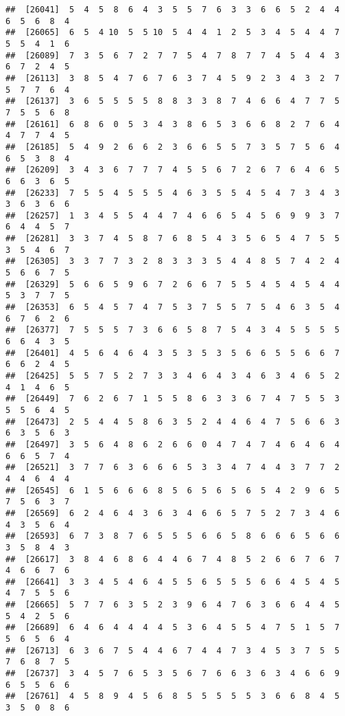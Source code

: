 \documentclass[
]{book}
\begin{document}
\begin{verbatim}
##  [26041]  5  4  5  8  6  4  3  5  5  7  6  3  3  6  6  5  2  4  4  6  5  6  8  4
##  [26065]  6  5  4 10  5  5 10  5  4  4  1  2  5  3  4  5  4  4  7  5  5  4  1  6
##  [26089]  7  3  5  6  7  2  7  7  5  4  7  8  7  7  4  5  4  4  3  6  7  2  4  5
##  [26113]  3  8  5  4  7  6  7  6  3  7  4  5  9  2  3  4  3  2  7  5  7  7  6  4
##  [26137]  3  6  5  5  5  5  8  8  3  3  8  7  4  6  6  4  7  7  5  7  5  5  6  8
##  [26161]  6  8  6  0  5  3  4  3  8  6  5  3  6  6  8  2  7  6  4  4  7  7  4  5
##  [26185]  5  4  9  2  6  6  2  3  6  6  5  5  7  3  5  7  5  6  4  6  5  3  8  4
##  [26209]  3  4  3  6  7  7  7  4  5  5  6  7  2  6  7  6  4  6  5  6  6  3  6  5
##  [26233]  7  5  5  4  5  5  5  4  6  3  5  5  4  5  4  7  3  4  3  3  6  3  6  6
##  [26257]  1  3  4  5  5  4  4  7  4  6  6  5  4  5  6  9  9  3  7  6  4  4  5  7
##  [26281]  3  3  7  4  5  8  7  6  8  5  4  3  5  6  5  4  7  5  5  3  5  4  6  7
##  [26305]  3  3  7  7  3  2  8  3  3  3  5  4  4  8  5  7  4  2  4  5  6  6  7  5
##  [26329]  5  6  6  5  9  6  7  2  6  6  7  5  5  4  5  4  5  4  4  5  3  7  7  5
##  [26353]  6  5  4  5  7  4  7  5  3  7  5  5  7  5  4  6  3  5  4  6  7  6  2  6
##  [26377]  7  5  5  5  7  3  6  6  5  8  7  5  4  3  4  5  5  5  5  6  6  4  3  5
##  [26401]  4  5  6  4  6  4  3  5  3  5  3  5  6  6  5  5  6  6  7  6  6  2  4  5
##  [26425]  5  5  7  5  2  7  3  3  4  6  4  3  4  6  3  4  6  5  2  4  1  4  6  5
##  [26449]  7  6  2  6  7  1  5  5  8  6  3  3  6  7  4  7  5  5  3  5  5  6  4  5
##  [26473]  2  5  4  4  5  8  6  3  5  2  4  4  6  4  7  5  6  6  3  6  3  5  6  3
##  [26497]  3  5  6  4  8  6  2  6  6  0  4  7  4  7  4  6  4  6  4  6  6  5  7  4
##  [26521]  3  7  7  6  3  6  6  6  5  3  3  4  7  4  4  3  7  7  2  4  4  6  4  4
##  [26545]  6  1  5  6  6  6  8  5  6  5  6  5  6  5  4  2  9  6  5  7  5  6  3  7
##  [26569]  6  2  4  6  4  3  6  3  4  6  6  5  7  5  2  7  3  4  6  4  3  5  6  4
##  [26593]  6  7  3  8  7  6  5  5  5  6  6  5  8  6  6  6  5  6  6  3  5  8  4  3
##  [26617]  3  8  4  6  8  6  4  4  6  7  4  8  5  2  6  6  7  6  7  4  6  6  7  6
##  [26641]  3  3  4  5  4  6  4  5  5  6  5  5  5  6  6  4  5  4  5  4  7  5  5  6
##  [26665]  5  7  7  6  3  5  2  3  9  6  4  7  6  3  6  6  4  4  5  5  4  2  5  6
##  [26689]  6  4  6  4  4  4  4  5  3  6  4  5  5  4  7  5  1  5  7  5  6  5  6  4
##  [26713]  6  3  6  7  5  4  4  6  7  4  4  7  3  4  5  3  7  5  5  7  6  8  7  5
##  [26737]  3  4  5  7  6  5  3  5  6  7  6  6  3  6  3  4  6  6  9  6  5  5  6  6
##  [26761]  4  5  8  9  4  5  6  8  5  5  5  5  5  3  6  6  8  4  5  3  5  0  8  6

\end{verbatim}
\end{document}
